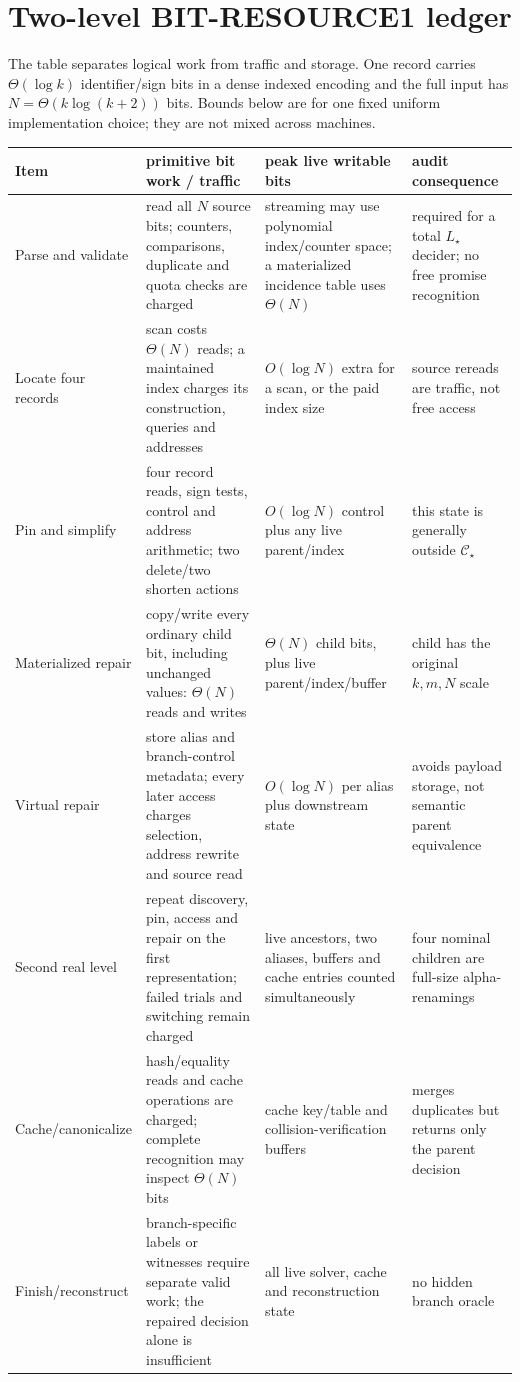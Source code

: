 \documentclass[11pt]{article}
\newcommand{\Cs}{\mathcal C_\star}
\begin{document}
\section{Two-level BIT-RESOURCE1 ledger}
The table separates logical work from traffic and storage.  One record carries
$\Theta(\log k)$ identifier/sign bits in a dense indexed encoding and the full
input has $N=\Theta(k\log(k+2))$ bits.  Bounds below are for one fixed uniform
implementation choice; they are not mixed across machines.

\begin{longtable}{p{.20\linewidth}p{.24\linewidth}p{.23\linewidth}p{.23\linewidth}}
\toprule
Item & primitive bit work / traffic & peak live writable bits & audit consequence\\
\midrule
Parse and validate & read all $N$ source bits; counters, comparisons, duplicate and quota checks are charged & streaming may use polynomial index/counter space; a materialized incidence table uses $\Theta(N)$ & required for a total $L_\star$ decider; no free promise recognition\\
Locate four records & scan costs $\Theta(N)$ reads; a maintained index charges its construction, queries and addresses & $O(\log N)$ extra for a scan, or the paid index size & source rereads are traffic, not free access\\
Pin and simplify & four record reads, sign tests, control and address arithmetic; two delete/two shorten actions & $O(\log N)$ control plus any live parent/index & this state is generally outside $\Cs$\\
Materialized repair & copy/write every ordinary child bit, including unchanged values: $\Theta(N)$ reads and writes & $\Theta(N)$ child bits, plus live parent/index/buffer & child has the original $k,m,N$ scale\\
Virtual repair & store alias and branch-control metadata; every later access charges selection, address rewrite and source read & $O(\log N)$ per alias plus downstream state & avoids payload storage, not semantic parent equivalence\\
Second real level & repeat discovery, pin, access and repair on the first representation; failed trials and switching remain charged & live ancestors, two aliases, buffers and cache entries counted simultaneously & four nominal children are full-size alpha-renamings\\
Cache/canonicalize & hash/equality reads and cache operations are charged; complete recognition may inspect $\Theta(N)$ bits & cache key/table and collision-verification buffers & merges duplicates but returns only the parent decision\\
Finish/reconstruct & branch-specific labels or witnesses require separate valid work; the repaired decision alone is insufficient & all live solver, cache and reconstruction state & no hidden branch oracle\\
\bottomrule
\end{longtable}
\end{document}
